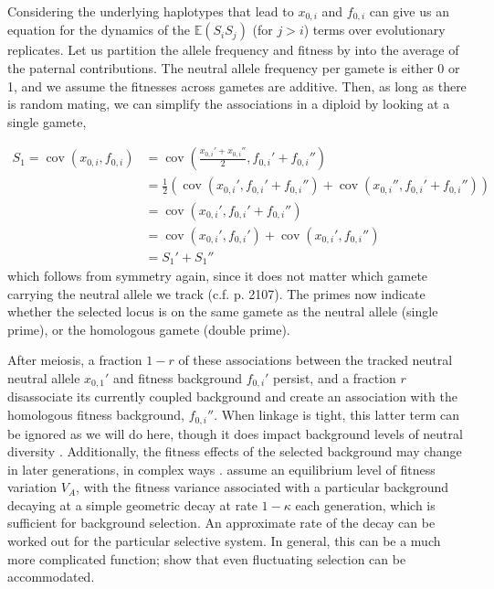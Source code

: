 \documentclass[11pt]{article}
\newcommand{\E}{\mathbb{E}}
\DeclareMathOperator{\cov}{cov}
\begin{document}
Considering the underlying haplotypes that lead to $x_{0,i}$ and $f_{0,i}$ can
give us an equation for the dynamics of the $\E(S_i S_j)$ (for $j > i$) terms
over evolutionary replicates. Let us partition the allele frequency and fitness
by into the average of the paternal contributions. The neutral allele frequency
per gamete is either 0 or 1, and we assume the fitnesses across gametes are
additive. Then, as long as there is random mating, we can simplify the
associations in a diploid by looking at a single gamete,

\begin{align}
  S_1 = \cov(x_{0,i}, f_{0,i}) &= \cov\left(\frac{x_{0,i}' + x_{0,i}''}{2}, f_{0,i}' + f_{0,i}''\right) \nonumber \\
                               &= \frac{1}{2}\left(\cov(x_{0,i}', f_{0,i}' + f_{0,i}'') + \cov(x_{0,i}'', f_{0,i}' + f_{0,i}'')\right) \nonumber  \\
                               &= \cov(x_{0,i}', f_{0,i}' + f_{0,i}'') \nonumber \\
                               &= \cov(x_{0,i}', f_{0,i}') + \cov(x_{0,i}', f_{0,i}'') \nonumber \\
                               &= S_1' + S_1''
\end{align}
%
which follows from symmetry again, since it does not matter which gamete
carrying the neutral allele we track (c.f. \cite{Santiago1998-bs} p. 2107). The
primes now indicate whether the selected locus is on the same gamete as the
neutral allele (single prime), or the homologous gamete (double prime).

After meiosis, a fraction $1-r$ of these associations between the tracked
neutral neutral allele $x_{0,1}'$ and fitness background $f_{0,i}'$ persist,
and a fraction $r$ disassociate its currently coupled background and create an
association with the homologous fitness background, $f_{0,i}''$. When linkage
is tight, this latter term can be ignored as we will do here, though it does
impact background levels of neutral diversity \parencite{Santiago1995-hx}.
Additionally, the fitness effects of the selected background may change in
later generations, in complex ways \parencite{Barton1986-yh,Turelli1990-kd}.
\textcite{Santiago1995-hx} assume an equilibrium level of fitness variation
$V_A$, with the fitness variance associated with a particular background
decaying at a simple geometric decay at rate $1-\kappa$ each generation, which
is sufficient for background selection. An approximate rate of the decay can be
worked out for the particular selective system. In general, this can be a much
more complicated function; \textcite{Buffalo2019-qs} show that even fluctuating
selection can be accommodated.
\end{document}
